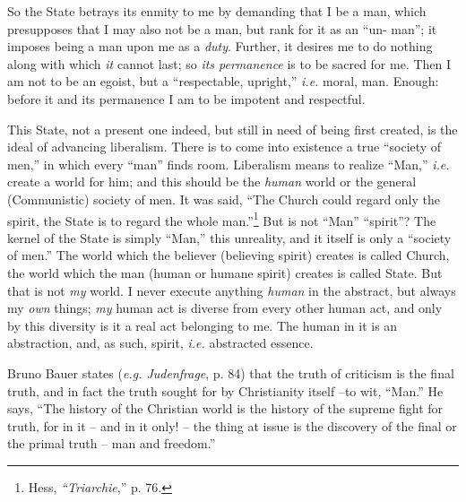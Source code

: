 So the State betrays its enmity to me by demanding that I be a man, which 
presupposes that I may also not be a man, but rank for it as an ``un- man''; 
it imposes being a man upon me as a \textit{duty}. Further, it desires me to 
do nothing along with which \textit{it} cannot last; so \textit{its 
permanence} is to be sacred for me. Then I am not to be an egoist, but a 
``respectable, upright,'' \textit{i.e.} moral, man. Enough: before it and 
its permanence I am to be impotent and respectful.

This State, not a present one indeed, but still in need of being first 
created, is the ideal of advancing liberalism. There is to come into existence 
a true ``society of men,'' in which every ``man'' finds room. Liberalism 
means to realize ``Man,'' \textit{i.e.} create a world for him; and this 
should be the \textit{human} world or the general (Communistic) society of 
men. It was said, ``The Church could regard only the spirit, the State is to 
regard the whole man.''\footnote{Hess, \textit{``Triarchie},'' p. 76.} But 
is not ``Man'' ``spirit''? The kernel of the State is simply ``Man,'' 
this unreality, and it itself is only a ``society of men.'' The world which 
the believer (believing spirit) creates is called Church, the world which the 
man (human or humane spirit) creates is called State. But that is not 
\textit{my} world. I never execute anything \textit{human} in the abstract, 
but always my \textit{own} things; \textit{my} human act is diverse from every 
other human act, and only by this diversity is it a real act belonging to me. 
The human in it is an abstraction, and, as such, spirit, \textit{i.e.} 
abstracted essence.

Bruno Bauer states (\textit{e.g. Judenfrage}, p. 84) that the truth of 
criticism is the final truth, and in fact the truth sought for by Christianity 
itself --to wit, ``Man.'' He says, ``The history of the Christian world is 
the history of the supreme fight for truth, for in it -- and in it only! -- 
the thing at issue is the discovery of the final or the primal truth -- man 
and freedom.''

